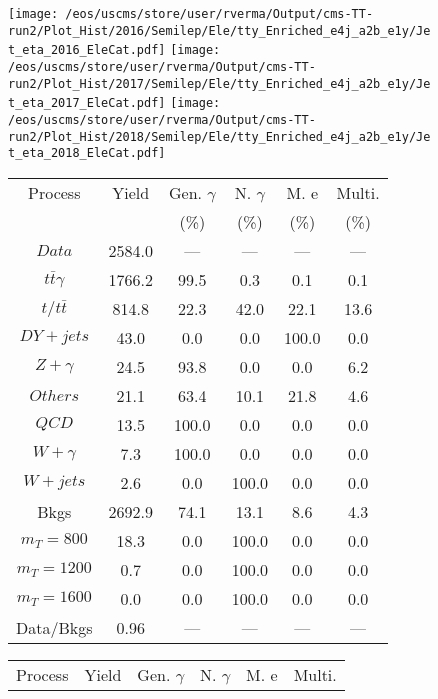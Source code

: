 \begin{figure}
\centering
\texttt{[image: /eos/uscms/store/user/rverma/Output/cms-TT-run2/Plot\_Hist/2016/Semilep/Ele/tty\_Enriched\_e4j\_a2b\_e1y/Jet\_eta\_2016\_EleCat.pdf]}
\texttt{[image: /eos/uscms/store/user/rverma/Output/cms-TT-run2/Plot\_Hist/2017/Semilep/Ele/tty\_Enriched\_e4j\_a2b\_e1y/Jet\_eta\_2017\_EleCat.pdf]}
\texttt{[image: /eos/uscms/store/user/rverma/Output/cms-TT-run2/Plot\_Hist/2018/Semilep/Ele/tty\_Enriched\_e4j\_a2b\_e1y/Jet\_eta\_2018\_EleCat.pdf]}
\begin{minipage}[c]{0.32\textwidth}
\centering
\tiny{
\begin{tabular}{cccccc}
\hline
Process & Yield & Gen. $\gamma$ & N. $\gamma$ & M. e & Multi. \\
 &  & (\%) & (\%) & (\%) & (\%)  \\
\hline
                                                                      $ Data $ &  2584.0 &  --- &  --- &  --- &  ---\\
$ t\bar{t}\gamma $ &  1766.2 &  99.5 &  0.3 &  0.1 &  0.1\\
$ t/t\bar{t} $ &  814.8 &  22.3 &  42.0 &  22.1 &  13.6\\
$ DY+jets $ &  43.0 &  0.0 &  0.0 &  100.0 &  0.0\\
$ Z+\gamma $ &  24.5 &  93.8 &  0.0 &  0.0 &  6.2\\
$ Others $ &  21.1 &  63.4 &  10.1 &  21.8 &  4.6\\
$ QCD $ &  13.5 &  100.0 &  0.0 &  0.0 &  0.0\\
$ W+\gamma $ &  7.3 &  100.0 &  0.0 &  0.0 &  0.0\\
$ W+jets $ &  2.6 &  0.0 &  100.0 &  0.0 &  0.0\\
Bkgs &  2692.9 &  74.1 &  13.1 &  8.6 &  4.3\\
$ m_{T} = 800 $ &  18.3 &  0.0 &  100.0 &  0.0 &  0.0\\
$ m_{T} = 1200 $ &  0.7 &  0.0 &  100.0 &  0.0 &  0.0\\
$ m_{T} = 1600 $ &  0.0 &  0.0 &  100.0 &  0.0 &  0.0\\
Data/Bkgs &  0.96 &  --- &  --- &  --- &  ---\\
\hline
\end{tabular}
}
\end{minipage}
\begin{minipage}[c]{0.32\textwidth}
\centering
\tiny{
\begin{tabular}{cccccc}
\hline
Process & Yield & Gen. $\gamma$ & N. $\gamma$ & M. e & Multi. \\

\end{tabular}}
\end{minipage}
\end{figure}
